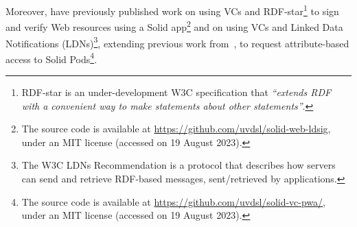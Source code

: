 Moreover, \cite{braun_selfverifying_2022,braun_attributebased_2022} have previously published work on using VCs and RDF-star\footnote{RDF-star\citep{arndt_rdfstar_2023} is an under-development W3C specification that \textit{``extends RDF with a convenient way to make statements about other statements''}.} to sign and verify Web resources using a Solid app\footnote{The source code is available at \url{https://github.com/uvdsl/solid-web-ldsig}, under an MIT license (accessed on 19 August 2023).} and on using VCs and Linked Data Notifications (LDNs)\footnote{The W3C LDNs Recommendation \citep{capadisli_linked_2017} is a protocol that describes how servers can send and retrieve RDF-based messages, sent/retrieved by applications.}, extending previous work from~\citeauthor{ezike_solidvc_2019}, to request attribute-based access to Solid Pods\footnote{The source code is available at \url{https://github.com/uvdsl/solid-vc-pwa/}, under an MIT license (accessed on 19 August 2023).}.